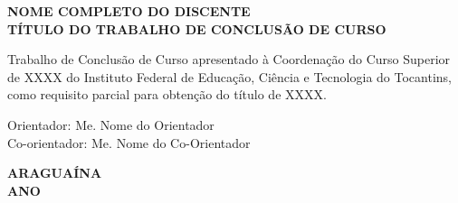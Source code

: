 \thispagestyle{empty}
\vfill
\begin{center}

    {\normalsize\textbf{NOME COMPLETO DO DISCENTE}\\}
    \vspace{6cm}
    {\normalsize\bfseries{TÍTULO DO TRABALHO DE CONCLUSÃO DE CURSO}\\}
    \vspace{2cm}
    \hspace{.45\linewidth}
    \begin{minipage}{.50\linewidth}

           \singlespacing  Trabalho de Conclusão de Curso apresentado à Coordenação do Curso Superior de XXXX do Instituto Federal de Educação, Ciência e Tecnologia do Tocantins, como requisito parcial para obtenção do título de XXXX.

    \vspace{1cm}
    
    {\raggedright{ Orientador: Me. Nome do Orientador \\
    			Co-orientador: Me. Nome do Co-Orientador}\\}
    
                         
    \end{minipage}
    \vspace{2cm}
    \vfill
    {\normalsize\textbf{ARAGUAÍNA\\ ANO}}
    \setcounter{page}{1} %
\end{center}


